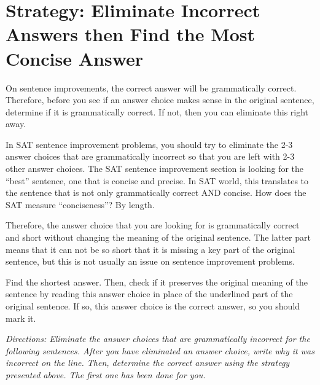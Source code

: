 \section{\sloppy Strategy: Eliminate Incorrect Answers then Find the Most Concise Answer}

On sentence improvements, the correct answer will be grammatically correct. Therefore, before you see if an answer choice makes sense in the original sentence, determine if it is grammatically correct. If not, then you can eliminate this right away.

\bigskip
In SAT sentence improvement problems, you should try to eliminate the 2-3 answer choices that are grammatically incorrect so that you are left with 2-3 other answer choices. The SAT sentence improvement section is looking for the ``best'' sentence, one that is concise and precise. In SAT world, this translates to the sentence that is not only grammatically correct AND concise. How does the SAT measure ``conciseness''? By length.

\bigskip
Therefore, the answer choice that you are looking for is grammatically correct and short without changing the meaning of the original sentence. The latter part means that it can not be so short that it is missing a key part of the original sentence,
but this is not usually an issue on sentence improvement problems.

\bigskip
Find the shortest answer. Then, check if it preserves the original meaning of the sentence by reading this answer choice in place of the underlined part of the original sentence. If so, this answer choice is the correct answer, so you should mark it.

\bigskip
\textit{Directions: Eliminate the answer choices that are grammatically incorrect for the following sentences. After you have eliminated an answer choice, write why it was incorrect on the line. Then, determine the correct answer using the strategy presented above. The first one has been done for you.}

